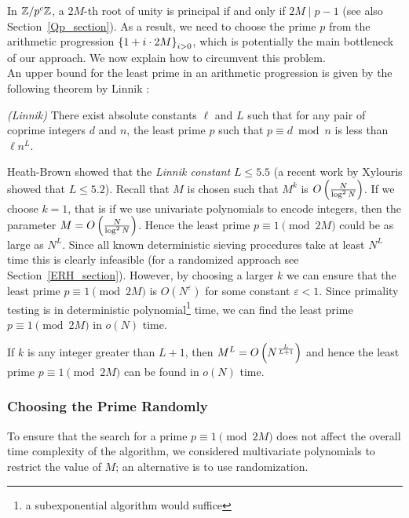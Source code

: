 \documentclass[11pt]{article}
\begin{document}
\noindent
In $\mathbb{Z}/p^c\mathbb{Z}$, a $2M$-th root of unity is principal if and only if
$2M\mid p-1$ (see also Section~\ref{Qp_section}). As a result, we need
to choose the prime $p$ from the arithmetic progression $\left\{1 +
  i\cdot 2M\right\}_{i> 0}$, which is potentially the main bottleneck of our
approach. We now explain how to circumvent this problem. \\


An upper bound for the least prime in an arithmetic progression is
given by the following theorem by Linnik \cite{L44}:

\begin{theorem}\label{linnik_theorem}
\emph{\textsf{(Linnik)}} There exist absolute constants $\ell$ and $L$
such that for any pair of coprime integers $d$ and $n$, the least
prime $p$ such that $p\equiv d\bmod{n}$ is less than $\ell n^L$.
\end{theorem}

Heath-Brown \cite{B92} showed that the \emph{Linnik constant} $L\leq
5.5$ (a recent work by Xylouris \cite{X09} showed that $L \leq
5.2$). Recall that $M$ is chosen such that $M^k$ is
$O\left(\frac{N}{\log^2N}\right)$. If we choose $k=1$, that is if we use
univariate polynomials to encode integers, then the parameter $M =
O\left(\frac{N}{\log^2N}\right)$. Hence the least prime $p\equiv
1\pmod{2M}$ could be as large as $N^L$. Since all known deterministic
sieving procedures take at least $N^L$ time this is clearly infeasible
(for a randomized approach see Section~\ref{ERH_section}). However, by
choosing a larger $k$ we can ensure that the least prime $p\equiv
1\pmod{2M}$ is $O(N^\varepsilon)$ for some constant $\varepsilon <
1$. Since primality testing is in deterministic polynomial\footnote{a
  subexponential algorithm would suffice} time\cite{AKS04}, we can find the least prime $p\equiv 1 \pmod{2M}$ in $o(N)$
time.


\begin{lemma}\label{prime_time}
If $k$ is any integer greater than $L+1$, then $M^L =
O\left(N^{\frac{L}{L+1}}\right)$ and hence the least prime $p\equiv
1\pmod{2M}$ can be found in $o(N)$ time.
\end{lemma}

\subsubsection*{Choosing the Prime Randomly}\label{ERH_section}

To ensure that the search for a prime $p\equiv 1\pmod{2M}$ does not
affect the overall time complexity of the algorithm, we considered
multivariate polynomials to restrict the value of $M$; an alternative
is to use randomization.
\end{document}
